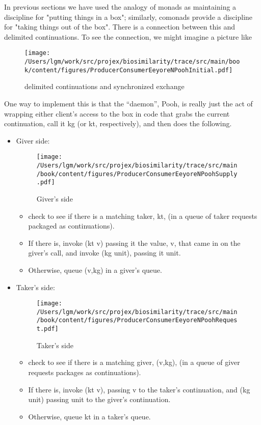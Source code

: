 In previous sections we have used the analogy of monads as maintaining
a discipline for "putting things in a box"; similarly, comonads
provide a discipline for "taking things out of the box". There is a
connection between this and delimited continuations. To see the
connection, we might imagine a picture like

\begin{figure}[tbp]
\begin{center}
{ \texttt{[image: /Users/lgm/work/src/projex/biosimilarity/trace/src/main/book/content/figures/ProducerConsumerEeyoreNPoohInitial.pdf]} }
\caption{ delimited continuations and synchronized exchange  }
\end{center}
\end{figure}

One way to implement this is that the ``daemon'', Pooh, is really just
the act of wrapping either client's access to the box in code that
grabs the current continuation, call it kg (or kt, respectively), and
then does the following.  
\begin{itemize}
  \item Giver side: 
    \begin{figure}[tbp]
      \begin{center}
        { \texttt{[image: /Users/lgm/work/src/projex/biosimilarity/trace/src/main/book/content/figures/ProducerConsumerEeyoreNPoohSupply.pdf]} }
        \caption{ Giver's side }
      \end{center}
    \end{figure}
    \begin{itemize} 
    \item check to see if there is a matching taker, kt, (in a queue
      of taker requests packaged as continuations). 
    \item If there is, invoke (kt v) passing it the value, v, that
      came in on the giver's call, and invoke (kg unit), passing it
      unit. 
    \item Otherwise, queue (v,kg) in a giver's queue.
    \end{itemize}
  \item Taker's side:
    \begin{figure}[tbp]
      \begin{center}
        { \texttt{[image: /Users/lgm/work/src/projex/biosimilarity/trace/src/main/book/content/figures/ProducerConsumerEeyoreNPoohRequest.pdf]} }
        \caption{ Taker's side }
      \end{center}
    \end{figure}
    \begin{itemize}
    \item check to see if there is a matching giver, (v,kg),
      (in a queue of giver requests packages as continuations).
    \item If there is, invoke (kt v), passing v to the taker's
      continuation, and (kg unit) passing unit to the giver's
      continuation.
    \item Otherwise, queue kt in a taker's queue.
  \end{itemize}
\end{itemize}


